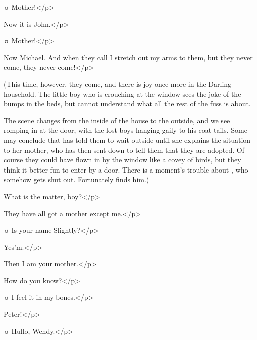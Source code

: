 \begin{drama}
\johnspeaks {}¤
Mother!</p>

\mrsdarlingspeaks
Now it is John.</p>

\michaelspeaks {}¤
Mother!</p>

\mrsdarlingspeaks
Now Michael.
And when they call I stretch out my arms to them, but they never come, they never come!</p>

\begin{stagedir}
(This time, however, they come, and there is joy once more in the Darling household.
The little boy who is crouching at the window sees the joke of the bumps in the beds,
but cannot understand what all the rest of the fuss is about.

The scene changes from the inside of the house to the outside,
and we see \mrdarling romping in at the door, with the lost boys hanging gaily to his coat-tails.
Some may conclude that \wendy has told them to wait outside until she explains the situation to her mother,
who has then sent \mrdarling down to tell them that they are adopted.
Of course they could have flown in by the window like a covey of birds,
but they think it better fun to enter by a door.
There is a moment's trouble about \slightly, who somehow gets shut out.
Fortunately \liza finds him.)
\end{stagedir}

\lizaspeaks
What is the matter, boy?</p>

\slightlyspeaks
They have all got a mother except me.</p>

\lizaspeaks {}¤
Is your name Slightly?</p>

\slightlyspeaks
Yes'm.</p>

\lizaspeaks
Then I am your mother.</p>

\slightlyspeaks
How do you know?</p>

\lizaspeaks {}¤
I feel it in my bones.</p>


\wendyspeaks
Peter!</p>

\peterspeaks {}¤
Hullo, Wendy.</p>


\end{drama}
